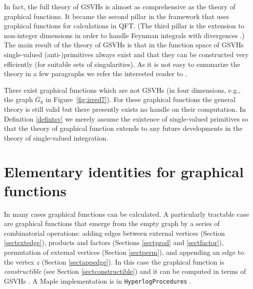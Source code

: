 \documentclass[oneside]{amsart}
\newcommand{\Gg}{{\overline{G}}}
\theoremstyle{plain}
\begin{document}
In fact, the full theory of GSVHs is almost as comprehensive as the theory of graphical functions. It became the second pillar in the framework that uses graphical functions
for calculations in QFT. (The third pillar is the extension to non-integer dimensions in order to handle Feynman integrals with divergences \cite{7loops}.)
The main result of the theory of GSVHs is that in the function space of GSVHs single-valued (anti-)primitives always exist and that they can be constructed very efficiently
(for suitable sets of singularities). As it is not easy to summarize the theory in a few paragraphs we refer the interested reader to \cite{GSVH}.

There exist graphical functions which are not GSVHs (in four dimensions, e.g., the graph $\Gg_8$ in Figure~\ref{fig:irred7}).
For these graphical functions the general theory is still valid but there presently exists no handle on their computation. In Definition \ref{defintsv} we
merely assume the existence of single-valued primitives so that the theory of graphical function extends to any future developments in the theory of single-valued integration.

\section{Elementary identities for graphical functions}\label{sectgfid1}
In many cases graphical functions can be calculated. A particularly tractable case are graphical functions that emerge from the empty graph by a series of combinatorial
operations: adding edges between external vertices (Section \ref{sectextedge}), products and factors (Sections \ref{sectprod} and \ref{sectfactor}),
permutation of external vertices (Section \ref{sectperm}), and appending an edge to the vertex $z$ (Section \ref{sectappedge}). In this case the graphical function is {\em constructible}
(see Section \ref{sectconstructible}) and it can be computed in terms of GSVHs \cite{GSVH}. A Maple implementation is in {\tt HyperlogProcedures} \cite{Shlog}.
\end{document}
